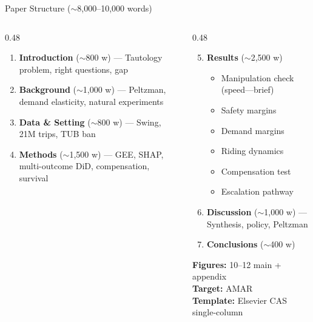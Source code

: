 \documentclass[aspectratio=169, 11pt]{beamer}
\begin{document}
\begin{frame}{Paper Structure ($\sim$8,000--10,000 words)}
\footnotesize
\begin{columns}[T]
\begin{column}{0.48\textwidth}
\begin{enumerate}
\item \textbf{Introduction} ($\sim$800 w) --- Tautology problem, right questions, gap
\item \textbf{Background} ($\sim$1,000 w) --- Peltzman, demand elasticity, natural experiments
\item \textbf{Data \& Setting} ($\sim$800 w) --- Swing, 21M trips, TUB ban
\item \textbf{Methods} ($\sim$1,500 w) --- GEE, SHAP, multi-outcome DiD, compensation, survival
\end{enumerate}
\end{column}
\begin{column}{0.48\textwidth}
\begin{enumerate}\setcounter{enumi}{4}
\item \textbf{Results} ($\sim$2,500 w)
  \begin{itemize}\footnotesize
  \item Manipulation check (speed---brief)
  \item Safety margins
  \item Demand margins
  \item Riding dynamics
  \item Compensation test
  \item Escalation pathway
  \end{itemize}
\item \textbf{Discussion} ($\sim$1,000 w) --- Synthesis, policy, Peltzman
\item \textbf{Conclusions} ($\sim$400 w)
\end{enumerate}

\vspace{0.15cm}
\textbf{\color{UMNMaroon}Figures:} 10--12 main + appendix\\
\textbf{Target:} AMAR\\
\textbf{Template:} Elsevier CAS single-column
\end{column}
\end{columns}
\end{frame}
\end{document}
